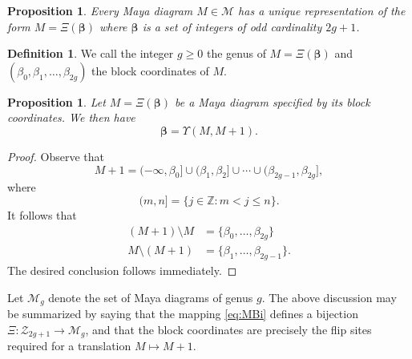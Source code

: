 \documentclass[10pt]{amsart}
\newtheorem{prop}[thm]{Proposition}
\theoremstyle{definition}
\newcommand{\todo}[1]{\vspace{5 mm}\par \noindent
\marginpar{\textsc{ToDo}}
\framebox{\begin{minipage}[c]{\textwidth}
\tt #1 \end{minipage}}\vspace{5 mm}\par}
\newtheorem{definition}[thm]{Definition}
\numberwithin{equation}{section}
\numberwithin{figure}{section}
\newcommand{\Z}{\mathbb{Z}}
\newcommand{\bbeta}{{\boldsymbol{\beta}}}
\newcommand{\bmu}{{\boldsymbol{\mu}}}
\newcommand{\cM}{\mathcal{M}}
\newcommand{\cZ}{\mathcal{Z}}
\newcommand{\cZo}{\mathcal{Z}_{\text{odd}}}
\begin{document}
\begin{prop}
  Every Maya diagram $M\in \cM$ has a unique representation of the
  form $M=\Xi(\bbeta)$ where $\bbeta$ is a set of integers of odd
  cardinality $2g+1$.
\end{prop}
\begin{definition}\label{def:genus}
  We call the integer $g\geq 0$ the genus of $M= \Xi(\bbeta)$ and
  $(\beta_0,\beta_1,\ldots, \beta_{2g})$ the block coordinates of $M$.
\end{definition}
\noindent



\begin{prop}
  \label{prop:1cyclic}
  Let $M = \Xi(\bbeta)$ be a Maya diagram specified by its block
  coordinates.   We then have
  \[ \bbeta = \Upsilon(M,M+1).\]
\end{prop}
\begin{proof}
  Observe that
  \[ M+1 = (-\infty, \beta_0] \cup (\beta_1,\beta_2] \cup \cdots \cup
  (\beta_{2g-1}, \beta_{2g}],\]
  where
  \[ (m,n] = \{ j\in \Z \colon m<j\leq n \}.\]
  It follows that
  \begin{align*}
    (M+1)\setminus M &= \{ \beta_0, \ldots, \beta_{2g} \}\\
    M\setminus (M+1) &= \{ \beta_1,\ldots, \beta_{2g-1} \}.
  \end{align*}
  The desired conclusion follows immediately.
\end{proof}






Let $\cM_g$ denote the set of Maya diagrams of genus $g$.  The above
discussion may be summarized by saying that the mapping \eqref{eq:MBi}
defines a bijection $\Xi:\cZ_{2g+1} \to \cM_g$, and that the block
coordinates are precisely the flip sites required for a translation
$M\mapsto M+1$.
\end{document}
